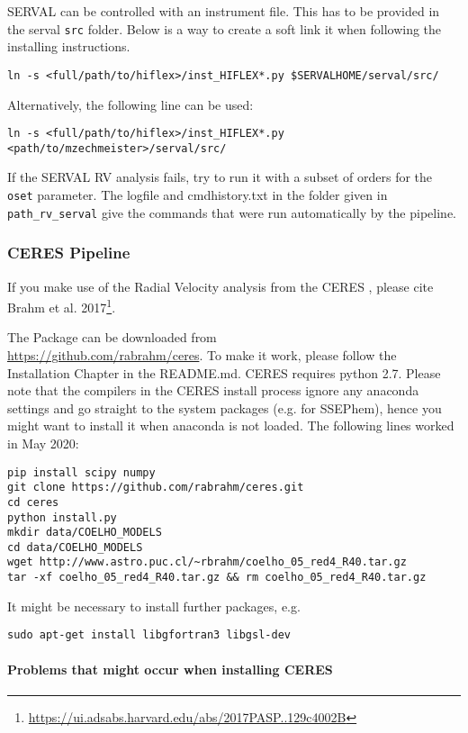 \documentclass[10pt,a4paper]{article}
\begin{document}
SERVAL can be controlled with an instrument file. This has to be provided in the serval \verb|src| folder. Below is a way to create a soft link it when following the installing instructions.
\begin{lstlisting}[style=base]
ln -s <full/path/to/hiflex>/inst_HIFLEX*.py $SERVALHOME/serval/src/
\end{lstlisting}
Alternatively, the following line can be used:
\begin{lstlisting}[style=base]
ln -s <full/path/to/hiflex>/inst_HIFLEX*.py <path/to/mzechmeister>/serval/src/
\end{lstlisting}

If the SERVAL RV analysis fails, try to run it with a subset of orders for the \verb|oset| parameter. The logfile and cmdhistory.txt in the folder given in \verb|path_rv_serval| give the commands that were run automatically by the pipeline.

\subsubsection{CERES Pipeline}
\label{Section:Explanation_CERES_pipeline}
If you make use of the Radial Velocity analysis from the CERES , please cite Brahm et al. 2017\footnote{\url{https://ui.adsabs.harvard.edu/abs/2017PASP..129c4002B}}.

The Package can be downloaded from\\ \url{https://github.com/rabrahm/ceres}. To make it work, please follow the Installation Chapter in the README.md. CERES requires python 2.7. Please note that the compilers in the CERES install process ignore any anaconda settings and go straight to the system packages (e.g. for SSEPhem), hence you might want to install it when anaconda is not loaded. The following lines worked in May 2020:
\begin{lstlisting}[style=base]
pip install scipy numpy
git clone https://github.com/rabrahm/ceres.git
cd ceres
python install.py
mkdir data/COELHO_MODELS
cd data/COELHO_MODELS
wget http://www.astro.puc.cl/~rbrahm/coelho_05_red4_R40.tar.gz
tar -xf coelho_05_red4_R40.tar.gz && rm coelho_05_red4_R40.tar.gz
\end{lstlisting}

It might be necessary to install further packages, e.g.
\begin{lstlisting}[style=base]
sudo apt-get install libgfortran3 libgsl-dev
\end{lstlisting}


\paragraph{Problems that might occur when installing CERES\\}
\end{document}
